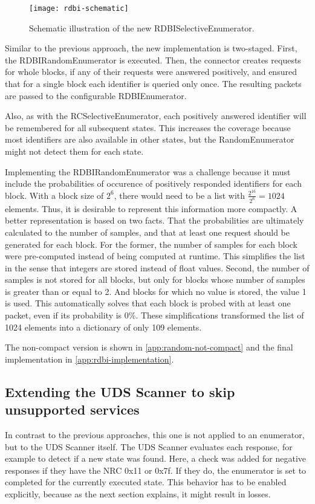 \begin{figure}[h]
    \centering
    \texttt{[image: rdbi-schematic]}
    \caption{Schematic illustration of the new RDBISelectiveEnumerator.}
    \label{fig:rdbi-schematic}
\end{figure}

Similar to the previous approach, the new implementation is two-staged. First, the RDBIRandomEnumerator is executed. Then, the connector creates requests for whole blocks, if any of their requests were answered positively, and ensured that for a single block each identifier is queried only once. The resulting packets are passed to the configurable RDBIEnumerator.

Also, as with the RCSelectiveEnumerator, each positively answered identifier will be remembered for all subsequent states. This increases the coverage because most identifiers are also available in other states, but the RandomEnumerator might not detect them for each state.

Implementing the RDBIRandomEnumerator was a challenge because it must include the probabilities of occurence of positively responded identifiers for each block. With a block size of $2^6$, there would need to be a list with $\frac{2^{16}}{2^6} = 1024$ elements. Thus, it is desirable to represent this information more compactly. A better representation is based on two facts. That the probabilities are ultimately calculated to the number of samples, and that at least one request should be generated for each block. For the former, the number of samples for each block were pre-computed instead of being computed at runtime. This simplifies the list in the sense that integers are stored instead of float values. Second, the number of samples is not stored for all blocks, but only for blocks whose number of samples is greater than or equal to 2. And blocks for which no value is stored, the value 1 is used. This automatically solves that each block is probed with at least one packet, even if its probability is 0\%. These simplifications transformed the list of 1024 elements into a dictionary of only 109 elements.

The non-compact version is shown in \autoref{app:random-not-compact} and the final implementation in \autoref{app:rdbi-implementation}.

\subsection{Extending the UDS Scanner to skip unsupported services}

In contrast to the previous approaches, this one is not applied to an enumerator, but to the UDS Scanner itself. The UDS Scanner evaluates each response, for example to detect if a new state was found. Here, a check was added for negative responses if they have the NRC 0x11 or 0x7f. If they do, the enumerator is set to completed for the currently executed state. This behavior has to be enabled explicitly, because as the next section explains, it might result in losses.
